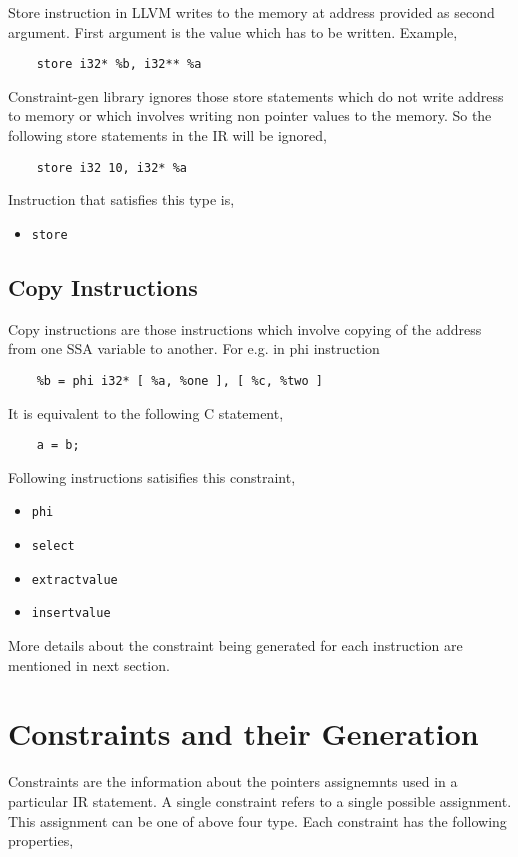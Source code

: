 \documentclass[a4paper,12pt]{report}
\begin{document}
\noindent
Store instruction in LLVM writes to the memory at address provided as second
argument. First argument is the value which has to be written.
Example,
\begin{verbatim}
    store i32* %b, i32** %a
\end{verbatim}

\noindent
Constraint-gen library ignores those store statements which do not write address
to memory or which involves writing non pointer values to the memory. So the
following store statements in the IR will be ignored,

\begin{lstlisting}
    store i32 10, i32* %a
\end{lstlisting}

\noindent
Instruction that satisfies this type is,
\begin{itemize}
 \item \texttt{store}
\end{itemize}


\subsection{Copy Instructions}
Copy instructions are those instructions which involve copying of the address 
from one SSA variable to another. For e.g. in phi instruction
\begin{lstlisting}
    %b = phi i32* [ %a, %one ], [ %c, %two ]
\end{lstlisting}

\noindent
It is equivalent to the following C statement,
\begin{lstlisting}
    a = b;
\end{lstlisting}

\noindent
Following instructions satisifies this constraint,
\begin{itemize}
    \item \texttt{phi}
    \item \texttt{select}
    \item \texttt{extractvalue}
    \item \texttt{insertvalue}
\end{itemize}

More details about the constraint being generated for each instruction are
mentioned in next section.

\section{Constraints and their Generation}
Constraints are the information about the pointers assignemnts used in a 
particular IR statement. A single constraint refers to a single possible 
assignment. This assignment can be one of above four type. Each constraint has 
the following properties,
\end{document}
